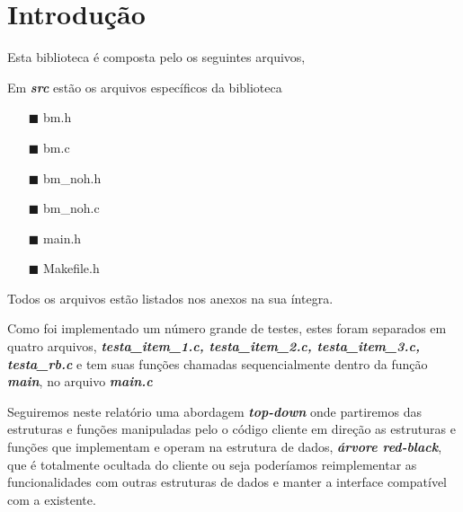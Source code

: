 \documentclass [a4paper, 12pt] {article}
\newcommand{\enf}[1]{\emph{\textbf{#1}}}
\begin{document}
\section {Introdução}
\noindent Esta biblioteca é composta pelo os seguintes arquivos, \\
\begin{tcolorbox}[boxrule = 0.5pt]
\begin{center}
\end{center}
\end{tcolorbox}
\noindent Em \enf{src} estão os arquivos específicos da biblioteca\\
\begin{itemize}
    \item [$\blacksquare$] bm.h
    \item [$\blacksquare$] bm.c
    \item [$\blacksquare$] bm_noh.h
    \item [$\blacksquare$] bm_noh.c
    \item [$\blacksquare$] main.h 
    \item [$\blacksquare$] Makefile.h 
\end{itemize}

Todos os arquivos estão listados nos anexos na sua íntegra.

Como foi implementado um número grande de testes, estes foram separados em quatro
arquivos,  \enf{testa_item_1.c, testa_item_2.c, testa_item_3.c, testa_rb.c}
e tem suas funções chamadas sequencialmente dentro da função \enf{main}, no arquivo \enf{main.c}

Seguiremos neste relatório uma abordagem \enf{top-down} onde partiremos das estruturas 
e funções manipuladas pelo o código cliente em direção as estruturas e funções que implementam
e operam na estrutura de dados, \enf{árvore red-black}, que é totalmente ocultada do cliente
ou seja poderíamos reimplementar as funcionalidades com outras estruturas de dados e manter 
a interface compatível com a existente.
\end{document}
